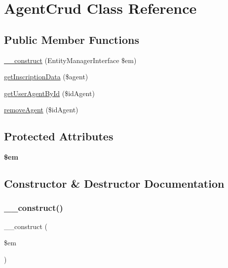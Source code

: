 \hypertarget{class_app_1_1_d_a_l_1_1_agent_crud}{}\section{Agent\+Crud Class Reference}
\label{class_app_1_1_d_a_l_1_1_agent_crud}
\subsection*{Public Member Functions}
\begin{DoxyCompactItemize}
\item 
\mbox{\hyperlink{class_app_1_1_d_a_l_1_1_agent_crud_a25f4258aeb5ce2a61a2504cb7c058485}{\+\_\+\+\_\+construct}} (Entity\+Manager\+Interface \$em)
\item 
\mbox{\hyperlink{class_app_1_1_d_a_l_1_1_agent_crud_a98ddf8e568810488fd589cab24b8782d}{get\+Inscription\+Data}} (\$agent)
\item 
\mbox{\hyperlink{class_app_1_1_d_a_l_1_1_agent_crud_a82bc20c060e0b47814cec5250effe51b}{get\+User\+Agent\+By\+Id}} (\$id\+Agent)
\item 
\mbox{\hyperlink{class_app_1_1_d_a_l_1_1_agent_crud_a6a57a8759329d23af8df40c5ec5494f4}{remove\+Agent}} (\$id\+Agent)
\end{DoxyCompactItemize}
\subsection*{Protected Attributes}
\begin{DoxyCompactItemize}
\item 
\mbox{\label{class_app_1_1_d_a_l_1_1_agent_crud_a0f2991d5fed029ef50ef619f1a532d06}} 
{\bfseries \$em}
\end{DoxyCompactItemize}


\subsection{Constructor \& Destructor Documentation}
\mbox{\label{class_app_1_1_d_a_l_1_1_agent_crud_a25f4258aeb5ce2a61a2504cb7c058485}} 
\subsubsection{\texorpdfstring{\_\_construct()}{\_\_construct()}}
{\footnotesize\ttfamily \+\_\+\+\_\+construct (\begin{DoxyParamCaption}\item[{Entity\+Manager\+Interface}]{\$em }\end{DoxyParamCaption})}

